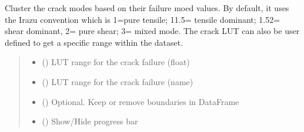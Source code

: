 \documentclass[letterpaper,10pt,english]{sphinxmanual}
\begin{document}
\begin{fulllineitems}
\begin{fulllineitems}
\end{fulllineitems}


\begin{fulllineitems}
\label{\detokenize{openfdem:openfdem.openfdem.Model.crack_failure_mode_clustering}}
\pysigstartsignatures
{}
\pysigstopsignatures
\sphinxAtStartPar
Cluster the crack modes based on their failure moed values. By default, it uses the Irazu convention which is 1=pure tensile; 1\sphinxhyphen{}1.5= tensile dominant; 1.5\sphinxhyphen{}2= shear dominant, 2= pure shear; 3= mixed mode. The crack LUT can also be user defined to get a specific range within the dataset.
\begin{quote}\begin{description}
\begin{itemize}
\item {} 
\sphinxAtStartPar
{} (\sphinxstyleliteralemphasis{\sphinxupquote{{[}}}\sphinxstyleliteralemphasis{\sphinxupquote{{]}}}) \textendash{} LUT range for the crack failure (float)

\item {} 
\sphinxAtStartPar
{} (\sphinxstyleliteralemphasis{\sphinxupquote{{[}}}\sphinxstyleliteralemphasis{\sphinxupquote{{]}}}) \textendash{} LUT range for the crack failure (name)

\item {} 
\sphinxAtStartPar
{} () \textendash{} Optional. Keep or remove boundaries in DataFrame

\item {} 
\sphinxAtStartPar
{} () \textendash{} Show/Hide progress bar


\end{itemize}
\end{description}
\end{quote}
\end{fulllineitems}
\end{fulllineitems}
\end{document}
